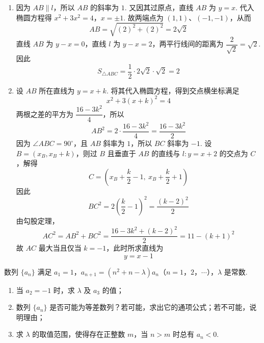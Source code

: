 \begin{solution}
\begin{enumerate}
\item 因为 \(AB\parallel l\)，所以 \(AB\) 的斜率为 \(1\). 又因其过原点，直线 \(AB\) 为 \(y=x\). 代入椭圆方程得
\(x^2+3x^2=4\)，\(x=\pm1\).
故两端点为 \((1,1)\)、\((-1,-1)\)，从而
\[
AB=\sqrt{(2)^2+(2)^2}=2\sqrt2
\]
直线 \(AB\) 为 \(y-x=0\)，直线 \(l\) 为 \(y-x=2\)，两平行线间的距离为 \(\dfrac2{\sqrt2}=\sqrt2\). 因此
\[
S_{\triangle ABC}=\frac12\cdot2\sqrt2\cdot\sqrt2=2
\]
\item 设 \(AB\) 所在直线为 \(y=x+k\). 将其代入椭圆方程，得到交点横坐标满足
\[
x^2+3(x+k)^2=4
\]
两根之差的平方为 \(\dfrac{16-3k^2}{4}\)，所以
\[
AB^2=2\cdot\frac{16-3k^2}{4}=\frac{16-3k^2}{2}
\]
因为 \(\angle ABC=90^\circ\)，且 \(AB\) 斜率为 \(1\)，所以 \(BC\) 斜率为 \(-1\). 设 \(B=(x_B,x_B+k)\)，则过 \(B\) 且垂直于 \(AB\) 的直线与 \(l:y=x+2\) 的交点为 \(C\)，解得
\[
C=\left(x_B+\frac{k}{2}-1,\ x_B+\frac{k}{2}+1\right)
\]
因此
\[
BC^2=2\left(\frac{k}{2}-1\right)^2=\frac{(k-2)^2}{2}
\]
由勾股定理，
\[
AC^2=AB^2+BC^2
 =\frac{16-3k^2+(k-2)^2}{2}
 =11-(k+1)^2
\]
故 \(AC\) 最大当且仅当 \(k=-1\)，此时所求直线为
\[
y=x-1
\]
\end{enumerate}
\end{solution}

\begin{problem}
数列 \(\{a_{n}\}\) 满足 \(a_1 = 1\)，\(a_{n+1} = (n^2 + n - \lambda)a_n\)（\(n = 1\)，\(2\)，\(\cdots\)），\(\lambda\) 是常数.

\begin{enumerate}
\item 当 \( a_{2} = -1 \) 时，求 \( \lambda \) 及 \( a_{3} \) 的值；
\item 数列 \(\{a_n\}\) 是否可能为等差数列？若可能，求出它的通项公式；若不可能，说明理由；
\item 求 \( \lambda \) 的取值范围，使得存在正整数 \(m\)，当 \( n > m \) 时总有 \( a_{n} < 0 \).
\end{enumerate}
\end{problem}

